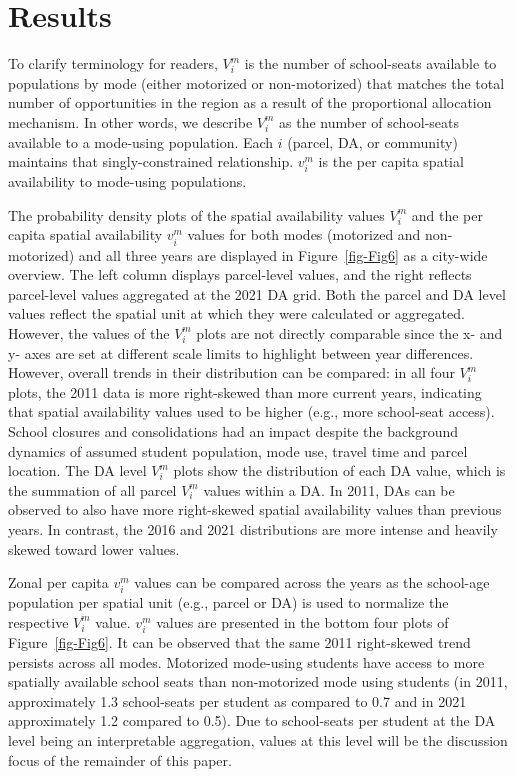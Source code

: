 \documentclass[
default
]{sn-jnl}
\begin{document}
\section{Results}\label{results}

To clarify terminology for readers, \(V_i^m\) is the number of
school-seats available to populations by mode (either motorized or
non-motorized) that matches the total number of opportunities in the
region as a result of the proportional allocation mechanism. In other
words, we describe \(V_i^m\) as the number of school-seats available to
a mode-using population. Each \(i\) (parcel, DA, or community) maintains
that singly-constrained relationship. \(v_i^m\) is the per capita
spatial availability to mode-using populations.

The probability density plots of the spatial availability values
\(V_i^m\) and the per capita spatial availability \(v_i^m\) values for
both modes (motorized and non-motorized) and all three years are
displayed in Figure~\ref{fig-Fig6} as a city-wide overview. The left
column displays parcel-level values, and the right reflects parcel-level
values aggregated at the 2021 DA grid. Both the parcel and DA level
values reflect the spatial unit at which they were calculated or
aggregated. However, the values of the \(V_i^m\) plots are not directly
comparable since the x- and y- axes are set at different scale limits to
highlight between year differences. However, overall trends in their
distribution can be compared: in all four \(V_i^m\) plots, the 2011 data
is more right-skewed than more current years, indicating that spatial
availability values used to be higher (e.g., more school-seat access).
School closures and consolidations had an impact despite the background
dynamics of assumed student population, mode use, travel time and parcel
location. The DA level \(V_i^m\) plots show the distribution of each DA
value, which is the summation of all parcel \(V_i^m\) values within a
DA. In 2011, DAs can be observed to also have more right-skewed spatial
availability values than previous years. In contrast, the 2016 and 2021
distributions are more intense and heavily skewed toward lower values.

Zonal per capita \(v_i^m\) values can be compared across the years as
the school-age population per spatial unit (e.g., parcel or DA) is used
to normalize the respective \(V_i^m\) value. \(v_i^m\) values are
presented in the bottom four plots of Figure~\ref{fig-Fig6}. It can be
observed that the same 2011 right-skewed trend persists across all
modes. Motorized mode-using students have access to more spatially
available school seats than non-motorized mode using students (in 2011,
approximately 1.3 school-seats per student as compared to 0.7 and in
2021 approximately 1.2 compared to 0.5). Due to school-seats per student
at the DA level being an interpretable aggregation, values at this level
will be the discussion focus of the remainder of this paper.
\end{document}
